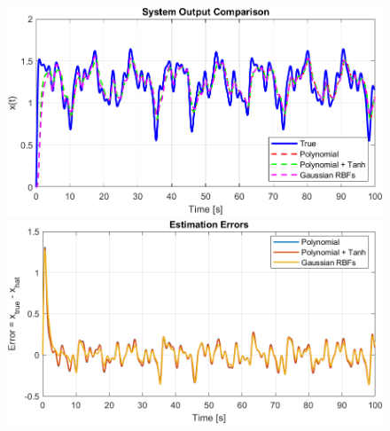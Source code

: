 \documentclass[12pt]{article} %
\numberwithin{equation}{section}  %
\begin{document}
\begin{figure}[ht!]
    \centering
    \begin{minipage}{0.49\textwidth}
        \centering
        \includegraphics[width=0.9\linewidth]{plots/plotB_8_all.png}
    \end{minipage}
    \hfill
    \begin{minipage}{0.49\textwidth}
        \centering
        \includegraphics[width=0.9\linewidth]{plots/plotB_9_all_err.png}
    \end{minipage}
    
    \vspace{1em} %
    

\end{figure}
\end{document}
